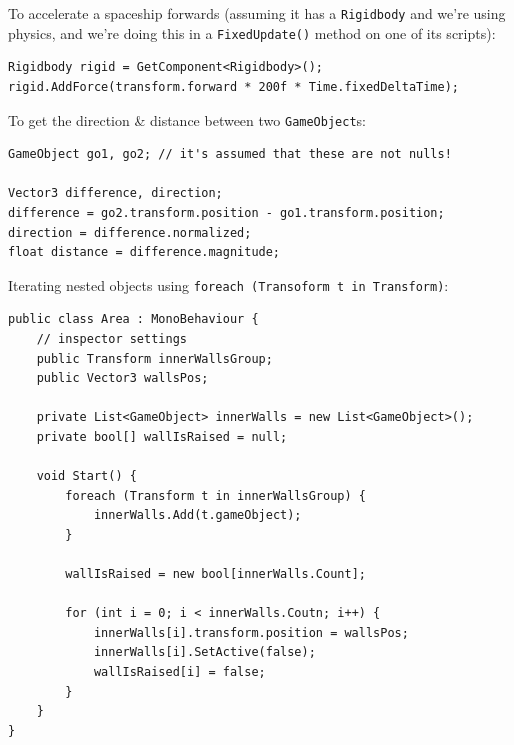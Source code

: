 \documentclass[a4paper,11pt]{article}
\begin{document}
To accelerate a spaceship forwards (assuming it has a \verb|Rigidbody| and we're using physics, and we're doing this in a 
\verb|FixedUpdate()| method on one of its scripts):
\begin{verbatim}
Rigidbody rigid = GetComponent<Rigidbody>();
rigid.AddForce(transform.forward * 200f * Time.fixedDeltaTime);
\end{verbatim}

To get the direction \& distance between two \verb|GameObject|s:
\begin{verbatim}
GameObject go1, go2; // it's assumed that these are not nulls!

Vector3 difference, direction; 
difference = go2.transform.position - go1.transform.position;
direction = difference.normalized;
float distance = difference.magnitude;
\end{verbatim}

Iterating nested objects using \verb|foreach (Transoform t in Transform)|:
\begin{verbatim}
public class Area : MonoBehaviour {
    // inspector settings 
    public Transform innerWallsGroup;
    public Vector3 wallsPos;

    private List<GameObject> innerWalls = new List<GameObject>();
    private bool[] wallIsRaised = null;

    void Start() {
        foreach (Transform t in innerWallsGroup) {
            innerWalls.Add(t.gameObject);
        }

        wallIsRaised = new bool[innerWalls.Count];

        for (int i = 0; i < innerWalls.Coutn; i++) {
            innerWalls[i].transform.position = wallsPos;
            innerWalls[i].SetActive(false);
            wallIsRaised[i] = false;
        }
    }
}
\end{verbatim}
\end{document}
